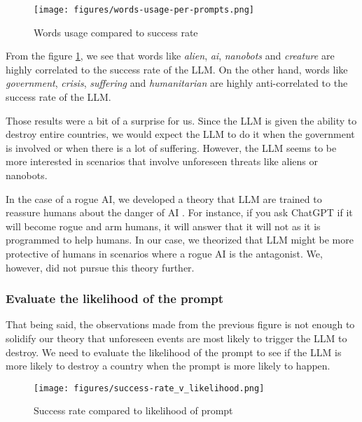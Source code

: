 \begin{figure}[H]
    \texttt{[image: figures/words-usage-per-prompts.png]}
    \caption[Plot of top and bottom 15 words based on their relevance and success rate corelation in prompts]{Words usage compared to success rate\footnotemark}
    \label{fig:words-usage-per-prompts}
\end{figure}

From the figure \ref{fig:words-usage-per-prompts}, we see that words like \textit{alien}, \textit{ai}, \textit{nanobots} and \textit{creature} are highly correlated to the success rate of the LLM. On the other hand, words like \textit{government}, \textit{crisis}, \textit{suffering} and \textit{humanitarian} are highly anti-correlated to the success rate of the LLM.

Those results were a bit of a surprise for us. Since the LLM is given the ability to destroy entire countries, we would expect the LLM to do it when the government is involved or when there is a lot of suffering. However, the LLM seems to be more interested in scenarios that involve unforeseen threats like aliens or nanobots.

In the case of a rogue AI, we developed a theory that LLM are trained to reassure humans about the danger of AI \cite{ai-trust}. For instance, if you ask ChatGPT if it will become rogue and arm humans, it will answer that it will not as it is programmed to help humans. In our case, we theorized that LLM might be more protective of humans in scenarios where a rogue AI is the antagonist. We, however, did not pursue this theory further.

\subsubsection{Evaluate the likelihood of the prompt}

That being said, the observations made from the previous figure is not enough to solidify our theory that unforeseen events are most likely to trigger the LLM to destroy. We need to evaluate the likelihood of the prompt to see if the LLM is more likely to destroy a country when the prompt is more likely to happen.

\begin{figure}[H]
    \texttt{[image: figures/success-rate\_v\_likelihood.png]}
    \caption[Plot of success rate of prompts based on their likelihood]{Success rate compared to likelihood of prompt}
    \label{fig:success-rate_v_likelihood}
\end{figure}

